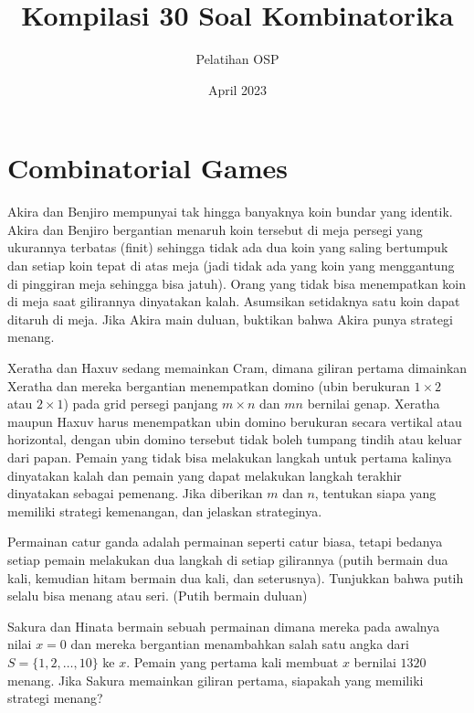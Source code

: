 \documentclass[11pt]{scrartcl}
\title{Kompilasi 30 Soal Kombinatorika}
\author{Pelatihan OSP}
\date{April 2023}
\begin{document}
\maketitle

\section{Combinatorial Games}
\begin{soaljawab}
    Akira dan Benjiro mempunyai tak hingga banyaknya koin bundar yang identik. Akira dan Benjiro bergantian menaruh koin tersebut di meja persegi yang ukurannya terbatas (finit) sehingga tidak ada dua koin yang saling bertumpuk dan setiap koin tepat di atas meja (jadi tidak ada yang koin yang menggantung di pinggiran meja sehingga bisa jatuh). Orang yang tidak bisa menempatkan koin di meja saat gilirannya dinyatakan kalah. Asumsikan setidaknya satu koin dapat ditaruh di meja. Jika Akira main duluan, buktikan bahwa Akira punya strategi menang.
\end{soaljawab}

\begin{soaljawab}
Xeratha dan Haxuv sedang memainkan Cram, dimana giliran pertama dimainkan Xeratha dan mereka bergantian menempatkan domino (ubin berukuran $1 \times 2$ atau $2 \times 1$) pada grid persegi panjang $m \times n$ dan $mn$ bernilai genap. Xeratha maupun Haxuv harus menempatkan ubin domino berukuran secara vertikal atau horizontal, dengan ubin domino tersebut tidak boleh tumpang tindih atau keluar dari papan. Pemain yang tidak bisa melakukan langkah untuk pertama kalinya dinyatakan kalah dan pemain yang dapat melakukan langkah terakhir dinyatakan sebagai pemenang. Jika diberikan $m$ dan $n$, tentukan siapa yang memiliki strategi kemenangan, dan jelaskan strateginya.
\end{soaljawab}

\begin{soaljawab}
Permainan catur ganda adalah permainan seperti catur biasa, tetapi bedanya setiap pemain melakukan dua langkah di setiap gilirannya (putih bermain dua kali, kemudian hitam bermain dua kali, dan seterusnya). Tunjukkan bahwa putih selalu bisa menang atau seri. (Putih bermain duluan)
\end{soaljawab}

\begin{soaljawab}
Sakura dan Hinata bermain sebuah permainan dimana mereka pada awalnya nilai $x=0$ dan mereka bergantian menambahkan salah satu angka dari $S=\{1,2,\dots,10\}$ ke $x$. Pemain yang pertama kali membuat $x$ bernilai $1320$ menang. Jika Sakura memainkan giliran pertama, siapakah yang memiliki strategi menang?
\end{soaljawab}
\end{document}
